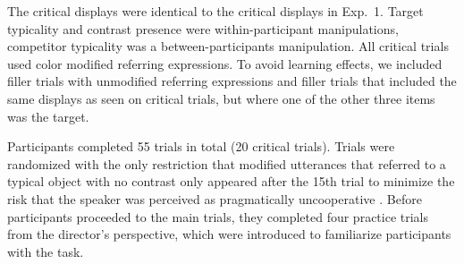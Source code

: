 \documentclass[10pt,letterpaper]{article}
\begin{document}
The critical displays were identical to the critical displays in Exp.~1.
Target typicality and contrast presence were within-participant manipulations, competitor typicality was a between-participants manipulation. All critical trials used color modified referring expressions. 
To avoid learning effects, we included filler trials with unmodified referring expressions and filler trials that included the same displays as seen on critical trials, but where one of the other three items was the target. 

Participants completed 55 trials in total (20 critical trials). Trials were randomized with the only restriction that modified utterances that referred to a typical object with no contrast only appeared after the 15th trial to minimize the risk that the speaker was perceived as pragmatically uncooperative \cite{Grodner:2011}. Before participants proceeded to the main trials, they completed four practice trials from the director's perspective, which were introduced to familiarize participants with the task.
  
  




\end{document}
